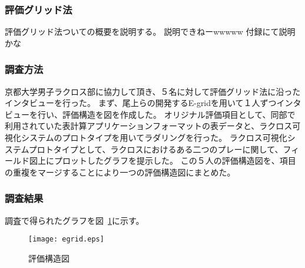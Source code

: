 \documentclass[sotsuron]{kuee}
\begin{document}
			\subsubsection{評価グリッド法}
				評価グリッド法ついての概要を説明する。
				説明できねーwwwww
				付録にて説明かな
			\subsubsection{調査方法}
				京都大学男子ラクロス部に協力して頂き、５名に対して評価グリッド法に沿ったインタビューを行った。
				まず、尾上らの開発するE-gridを用いて１人ずつインタビューを行い、評価構造を図を作成した。
				オリジナル評価項目として、同部で利用されていた表計算アプリケーションフォーマットの表データと、ラクロス可視化システムのプロトタイプを用いてラダリングを行った。
				ラクロス可視化システムプロトタイプとして、ラクロスにおけるある二つのプレーに関して、フィールド図上にプロットしたグラフを提示した。
				この５人の評価構造図を、項目の重複をマージすることにより一つの評価構造図にまとめた。
			\subsubsection{調査結果}	
				調査で得られたグラフを図~\ref{fig:egrid}に示す。
					\begin{figure}
						\begin{center}
							\texttt{[image: egrid.eps]}
						\end{center}
						\caption{評価構造図}
				  		\label{fig:egrid}
					\end{figure}
\end{document}

